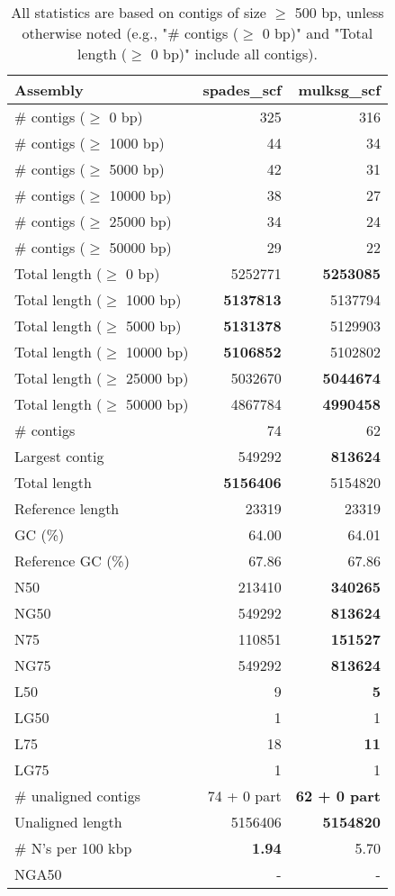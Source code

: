 \documentclass[12pt,a4paper]{article}
\begin{document}
\begin{table}[ht]
\begin{center}
\caption{All statistics are based on contigs of size $\geq$ 500 bp, unless otherwise noted (e.g., "\# contigs ($\geq$ 0 bp)" and "Total length ($\geq$ 0 bp)" include all contigs).}
\begin{tabular}{|l*{2}{|r}|}
\hline
Assembly & spades\_scf & mulksg\_scf \\ \hline
\# contigs ($\geq$ 0 bp) & 325 & 316 \\ \hline
\# contigs ($\geq$ 1000 bp) & 44 & 34 \\ \hline
\# contigs ($\geq$ 5000 bp) & 42 & 31 \\ \hline
\# contigs ($\geq$ 10000 bp) & 38 & 27 \\ \hline
\# contigs ($\geq$ 25000 bp) & 34 & 24 \\ \hline
\# contigs ($\geq$ 50000 bp) & 29 & 22 \\ \hline
Total length ($\geq$ 0 bp) & 5252771 & {\bf 5253085} \\ \hline
Total length ($\geq$ 1000 bp) & {\bf 5137813} & 5137794 \\ \hline
Total length ($\geq$ 5000 bp) & {\bf 5131378} & 5129903 \\ \hline
Total length ($\geq$ 10000 bp) & {\bf 5106852} & 5102802 \\ \hline
Total length ($\geq$ 25000 bp) & 5032670 & {\bf 5044674} \\ \hline
Total length ($\geq$ 50000 bp) & 4867784 & {\bf 4990458} \\ \hline
\# contigs & 74 & 62 \\ \hline
Largest contig & 549292 & {\bf 813624} \\ \hline
Total length & {\bf 5156406} & 5154820 \\ \hline
Reference length & 23319 & 23319 \\ \hline
GC (\%) & 64.00 & 64.01 \\ \hline
Reference GC (\%) & 67.86 & 67.86 \\ \hline
N50 & 213410 & {\bf 340265} \\ \hline
NG50 & 549292 & {\bf 813624} \\ \hline
N75 & 110851 & {\bf 151527} \\ \hline
NG75 & 549292 & {\bf 813624} \\ \hline
L50 & 9 & {\bf 5} \\ \hline
LG50 & 1 & 1 \\ \hline
L75 & 18 & {\bf 11} \\ \hline
LG75 & 1 & 1 \\ \hline
\# unaligned contigs & 74 + 0 part & {\bf 62 + 0 part} \\ \hline
Unaligned length & 5156406 & {\bf 5154820} \\ \hline
\# N's per 100 kbp & {\bf 1.94} & 5.70 \\ \hline
NGA50 & - & - \\ \hline
\end{tabular}
\end{center}
\end{table}
\end{document}
